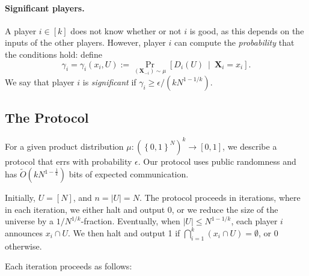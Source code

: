 \documentclass{article}
\newcommand{\set}[1]{\left\{#1\right\}}
\newcommand{\coloneq}{:=}
\newcommand{\eps}{\epsilon}
\newcommand{\given}{\medspace \middle| \medspace}
\newcommand{\rv}[1]{\mathbf{#1}}
\theoremstyle{plain}
\begin{document}
\paragraph{Significant players.}
A player $i \in [k]$ does not know whether or not $i$ is good,
as this depends on the inputs of the other players.
However, player $i$ can compute the \emph{probability} that the conditions hold:
define
\begin{equation*}
  \gamma_i = \gamma_i(x_i, U) \coloneq \Pr_{(\rv{X}_{-i}) \sim \mu}\left[ D_i(U) \given \rv{X}_i = x_i \right].
\end{equation*}
We say that player $i$ is \emph{significant} if $\gamma_i \geq \eps / (kN^{1-1/k})$.

\subsection{The Protocol}

For a given product distribution $\mu : \left(\set{0,1}^N\right)^k \rightarrow [0,1]$, we describe a protocol that errs with probability $\epsilon$.
Our protocol uses public randomness and has $\tilde{O}(kN^{1-\frac{1}{k}})$ bits of expected communication.

Initially, $U = [N]$, and $n = |U| = N$.
The protocol proceeds in iterations, where in each iteration, we either halt and output 0,
or we reduce the size of the universe by a $1/N^{1/k}$-fraction.
Eventually, when $|U| \leq N^{1-1/k}$, each player $i$ announces $x_i \cap U$.
We then halt and output 1 if $\bigcap_{i = 1}^k (x_i \cap U) = \emptyset$, or 0 otherwise.

Each iteration proceeds as follows:
\end{document}
